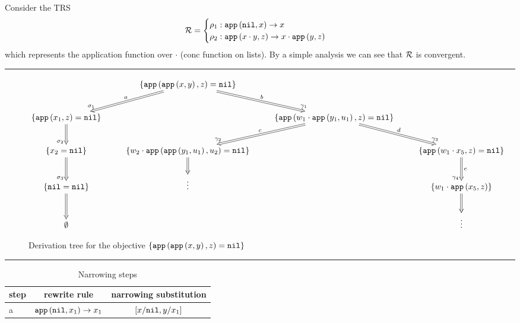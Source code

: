 \begin{example}
	Consider the TRS
	\[
		\mathcal{R} =
		\begin{cases}
			\rho_1: \mathtt{app}\left(\mathtt{nil},x\right) \rightarrow x \\
			\rho_2: \mathtt{app}\left(x \cdot y,z\right) \rightarrow x \cdot \mathtt{app}\left(y,z\right)
		\end{cases}
    \]
    which represents the application function over $\cdot$ (conc function on lists). By a simple analysis we can see that $\mathcal{R}$ is convergent.

    \begin{landscape}
        \thispagestyle{empty}
        \hrule
        \begin{figure}[h!]
            \begin{displaymath}
                \xymatrix{
                     & \{ \appFunc{\appFunc{x}{y}}{z} = \nilList \} \ar@{=>}[dl]_>>{\sigma_1}_a \ar@{=>}[dr]^>>{\gamma_1}^b & & \\
                    \{ \appFunc{x_1}{z} = \nilList \} \ar@{=>}[d]_>>{\sigma_2}  & & \{ \appFunc{w_1 \cdot \appFunc{y_1}{u_1}}{z} = \nilList \} \ar@{=>}[dl]_>>{\gamma_2}_c \ar@{=>}[dr]^>>{\gamma_3}^d & \\
                    \{ x_2 = \nilList \} \ar@{=>}[d]_>>{\sigma_3} & \{ w_2 \cdot \appFunc{\appFunc{y_1}{u_1}}{u_2} = \nilList \} \ar@{=>}[d] & & \{ \appFunc{w_1 \cdot x_5}{z} = \nilList \} \ar@{=>}[d]_>>{\gamma_4}^e \\
                    \{ \nilList = \nilList \} \ar@{=>}[d] & \vdots & & \{ w_1 \cdot \appFunc{x_5}{z} \} \ar@{=>}[d] \\
                    \emptyset & & &  \vdots \\
                }
            \end{displaymath}
            \caption{Derivation tree for the objective $\{ \mathtt{app}\left(\mathtt{app}\left(x,y\right),z\right) = \mathtt{nil} \}$}
            \label{figure:example:app:derivation-tree}
        \end{figure}
        \hrule
        \begin{table}[h!]
            \caption{Narrowing steps}
            \label{table:nice_table}
            \centering
            \begin{tabular}{l  c  c}
            \cline{1-3}
                step & rewrite rule & narrowing substitution \\
            \hline
            a & $\mathtt{app}\left(\mathtt{nil},x_1\right) \rightarrow x_1$ & $[x / \mathtt{nil}, y / x_1]$ \\


\end{tabular}
\end{table}
\end{landscape}
\end{example}
